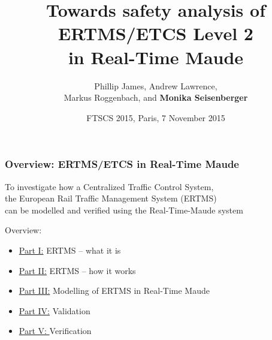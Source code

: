 \documentclass{beamer}
\title[ERTMS in Real Time Maude]{Towards safety analysis of ERTMS/ETCS Level 2 \\ in Real-Time
  Maude}
\author[Monika Seisenberger]{Phillip James, Andrew Lawrence, \\ Markus Roggenbach, and {\bf Monika Seisenberger}}
\date[FTSCS 2015, Paris]{FTSCS 2015, Paris, 7 November 2015}
\institute[Swansea University]{Swansea Railway Verification Group,\\ supported by Siemens Rail Automation}
\begin{document}
\begin{frame}
  \titlepage
\end{frame}


\begin{frame}

\frametitle{Overview:  ERTMS/ETCS in Real-Time
  Maude}

\medskip

\begin{center}
To investigate how a Centralized Traffic Control System, \\
the European Rail Traffic Management System (ERTMS) \\
can be modelled and verified using the Real-Time-Maude system
\end{center}

\bigskip

Overview:


\begin{itemize}
 \item \underline{Part I:} ERTMS -- what it is 
  \item \underline{Part II:} ERTMS -- how it works
  \item \underline{Part III:} Modelling of ERTMS in Real-Time Maude   
  \item \underline{Part IV:} Validation
\item \underline{Part V: } Verification
\end{itemize}

\bigskip

\end{frame}
\end{document}
